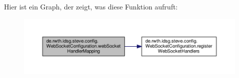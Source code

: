 Hier ist ein Graph, der zeigt, was diese Funktion aufruft\-:\nopagebreak
\begin{figure}[H]
\begin{center}
\leavevmode
\includegraphics[width=350pt]{classde_1_1rwth_1_1idsg_1_1steve_1_1config_1_1_web_socket_configuration_ae4bdb11cf22e1d830dbde50f33f101aa_cgraph}
\end{center}
\end{figure}




